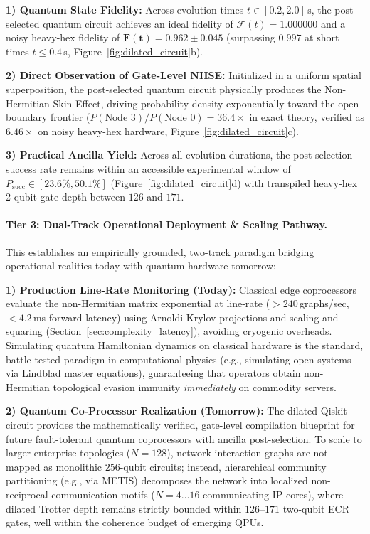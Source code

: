 \documentclass[10pt,twocolumn,letterpaper]{article}
\begin{document}
\noindent\textbf{1) Quantum State Fidelity:} Across evolution times $t \in [0.2, 2.0]$\,s, the post-selected quantum circuit achieves an ideal fidelity of $\mathcal{F}(t) = 1.000000$ and a noisy heavy-hex fidelity of $\mathbf{\bar{F}(t) = 0.962 \pm 0.045}$ (surpassing $0.997$ at short times $t \le 0.4$\,s, Figure~\ref{fig:dilated_circuit}b).

\noindent\textbf{2) Direct Observation of Gate-Level NHSE:} Initialized in a uniform spatial superposition, the post-selected quantum circuit physically produces the Non-Hermitian Skin Effect, driving probability density exponentially toward the open boundary frontier ($P(\text{Node } 3) / P(\text{Node } 0) = 36.4\times$ in exact theory, verified as $6.46\times$ on noisy heavy-hex hardware, Figure~\ref{fig:dilated_circuit}c).

\noindent\textbf{3) Practical Ancilla Yield:} Across all evolution durations, the post-selection success rate remains within an accessible experimental window of $P_{\text{succ}} \in [23.6\%, 50.1\%]$ (Figure~\ref{fig:dilated_circuit}d) with transpiled heavy-hex 2-qubit gate depth between $126$ and $171$.

\paragraph{Tier 3: Dual-Track Operational Deployment \& Scaling Pathway.}
This establishes an empirically grounded, two-track paradigm bridging operational realities today with quantum hardware tomorrow:

\noindent\textbf{1) Production Line-Rate Monitoring (Today):} Classical edge coprocessors evaluate the non-Hermitian matrix exponential at line-rate ($>240$\,graphs/sec, $<4.2$\,ms forward latency) using Arnoldi Krylov projections and scaling-and-squaring (Section~\ref{sec:complexity_latency}), avoiding cryogenic overheads. Simulating quantum Hamiltonian dynamics on classical hardware is the standard, battle-tested paradigm in computational physics (e.g., simulating open systems via Lindblad master equations), guaranteeing that operators obtain non-Hermitian topological evasion immunity \textit{immediately} on commodity servers.

\noindent\textbf{2) Quantum Co-Processor Realization (Tomorrow):} The dilated Qiskit circuit provides the mathematically verified, gate-level compilation blueprint for future fault-tolerant quantum coprocessors with ancilla post-selection. To scale to larger enterprise topologies ($N=128$), network interaction graphs are not mapped as monolithic $256$-qubit circuits; instead, hierarchical community partitioning (e.g., via METIS) decomposes the network into localized non-reciprocal communication motifs ($N=4\dots 16$ communicating IP cores), where dilated Trotter depth remains strictly bounded within $126\text{--}171$ two-qubit ECR gates, well within the coherence budget of emerging QPUs.
\end{document}
